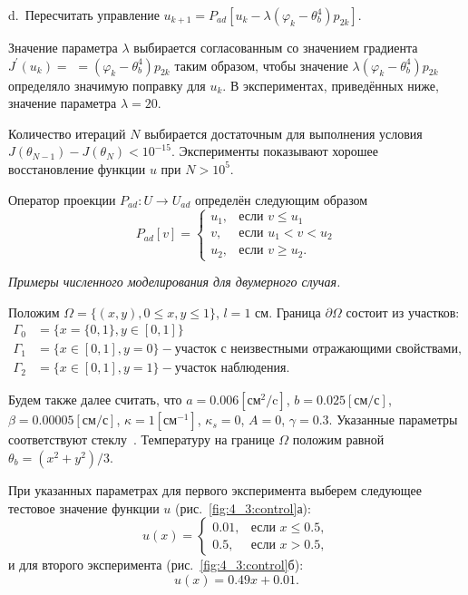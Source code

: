 \hspace{1cm} d.\  Пересчитать управление
$u_{k+1} = P_{ad}\left[ u_k - \lambda (\varphi_k - \theta_b^4)p_{2k} \right]$.


Значение параметра $\lambda$ выбирается согласованным со значением
градиента $J^{\prime}\left(u_{k}\right)=$ $=\left(\varphi_{k}-\theta_{b}^{4}\right) p_{2k}$
таким образом, чтобы значение $\lambda\left(\varphi_{k}-\theta_{b}^{4}\right) p_{2k}$
определяло значимую поправку для $u_{k}$.
В экспериментах, приведённых ниже, значение параметра $\lambda=20$.

Количество итераций $N$ выбирается достаточным для выполнения условия
$J\left(\theta_{N-1}\right)-J\left(\theta_{N}\right)<10^{-15}$.
Эксперименты показывают хорошее восстановление функции $u$ при $N>10^{5}$.

Оператор проекции $P_{ad} : U \to U_{ad}$ определён следующим образом
\[
    P_{ad}[v] =
    \begin{cases}
        u_1, & \text{если } v \le u_1 \\
        v, & \text{если } u_1 < v < u_2 \\
        u_2, & \text{если } v \ge u_2.
    \end{cases}
\]


\textit{Примеры численного моделирования для двумерного случая.}

Положим $\Omega = \{(x,y), 0 \leq x,y \leq 1\}$, $l = 1$ см.
Граница $\partial\Omega$ состоит из участков:
\[
    \begin{aligned}
        \Gamma_0 & = \{x=\{0,1\}, y \in [0,1]\} \\
        \Gamma_1 & = \{x\in [0,1], y=0\}
        - \text{участок с неизвестными отражающими свойствами}, \\
        \Gamma_2 & = \{x \in [0,1], y=1\} - \text{участок наблюдения}.
    \end{aligned}
\]

Будем также далее считать, что $a = 0.006[\text{см}^2/\text{c}]$,
$b=0.025[\text{см}/\text{с}]$, $\beta = 0.00005[\text{см}/\text{с}]$,
$\kappa=1[\text{см}^{-1}]$, $\kappa_s = 0$, $A = 0$, $\gamma = 0.3$.
Указанные параметры соответствуют стеклу~\cite{Grenkin2016a}.
Температуру на границе $\Omega$ положим равной $\theta_b = (x^2+y^2)/3$.

При указанных параметрах для первого эксперимента выберем следующее тестовое
значение функции $u$ (рис.~\ref{fig:4_3:control}а):
\begin{equation}
    \label{eq:4_3:equation}
    u(x)=
    \begin{cases}
        0.01, & \text{если } x \le 0.5, \\
        0.5, & \text{если } x > 0.5,
    \end{cases}
\end{equation}
и для второго эксперимента (рис.~\ref{fig:4_3:control}б):
\begin{equation}
    \label{eq:4_3:test_function_1}
    u(x)=0.49x+0.01.
\end{equation}

